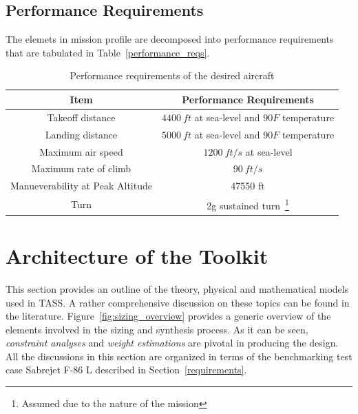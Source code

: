 \documentclass[pdftex,11pt,letter]{article}
\begin{document}
\subsection{Performance Requirements}
The elemets in mission profile are decomposed into performance requirements that are tabulated in Table~\ref{performance_reqs}.

\begin{table}[h]
\caption{Performance requirements of the desired aircraft}
\centering 
\begin{tabular}{c | c}
\hline\hline
Item  & Performance Requirements \\
\hline\hline
Takeoff distance 	& $4400~ft$ at sea-level and $90F$ temperature\\
Landing distance        & $5000~ft$  at sea-level and $90F$ temperature \\
Maximum air speed       & $1200~ft/s$ at sea-level \\
Maximum rate of climb   & $90~ft/s$\\
Manueverability at Peak Altitude                & 47550 ft\\
Turn                    & 2g sustained turn~\footnote{Assumed due to the nature of the mission}\\
\hline\hline
\end{tabular}
\label{tab:performance_reqs}
\end{table}


\section{Architecture of the Toolkit}\label{theory}
This section provides an outline of the theory, physical and mathematical models used in TASS. A rather comprehensive discussion on these topics can be found in the literature\cite{MattinglyText,NicolaiText,FieldingText,HoweText,RaymerText}. Figure~\ref{fig:sizing_overview} provides a generic overview of the elements involved in the sizing and synthesis process. As it can be seen, \emph{constraint analyses} and \emph{weight estimations} are pivotal in producing the design.  All the discussions in this section are organized in terms of the benchmarking test case Sabrejet F-86 L described in Section~\ref{requirements}.
\end{document}
